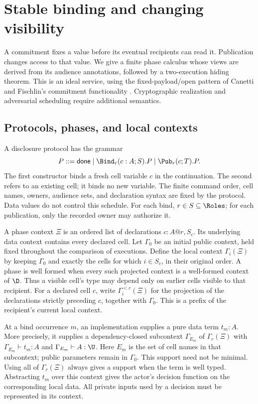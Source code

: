 \section{Stable binding and changing visibility}
\label{sec:disclosure}

A commitment fixes a value before its eventual recipients can read it.
Publication changes access to that value. We give a finite phase calculus
whose views are derived from its audience annotations, followed by a
two-execution hiding theorem. This is an ideal service, using the
fixed-payload/open pattern of Canetti and Fischlin's commitment functionality
\cite{CanettiFischlin2001}. Cryptographic realization and adversarial
scheduling require additional semantics.

\subsection{Protocols, phases, and local contexts}

A disclosure protocol has the grammar
\[
 P::=\mathsf{done}
   \mid \Bind_r(c:A;S).P
   \mid \Pub_r(c;T).P.
\]
The first constructor binds a fresh cell variable $c$ in the continuation.
The second refers to an existing cell; it binds no new variable.
The finite command order, cell names, owners, audience sets, and declaration
syntax are fixed by the protocol. Data values do not control this schedule.
For each bind, $r\in S\subseteq\Roles$; for each publication, only the
recorded owner may authorize it.

A phase context $\Xi$ is an ordered list of declarations
$c:A@r,S_c$. Its underlying data context contains every declared cell.
Let $\Gamma_0$ be an initial public context, held fixed throughout the
comparison of executions. Define the local context $\Gamma_i(\Xi)$ by
keeping $\Gamma_0$ and exactly the cells for which $i\in S_c$, in their
original order. A phase is well formed when every such projected context
is a well-formed context of $\D$. Thus a visible cell's type may depend
only on earlier cells visible to that recipient.
For a declared cell $c$, write $\Gamma_i^{<c}(\Xi)$ for the projection
of the declarations strictly preceding $c$, together with $\Gamma_0$.
This is a prefix of the recipient's current local context.

At a bind occurrence $m$, an implementation supplies a pure data term
$t_m:A$. More precisely, it supplies a dependency-closed subcontext
$\Gamma_{E_m}$ of $\Gamma_r(\Xi)$ with
$\Gamma_{E_m}\vdash t_m:A$ and $\Gamma_{E_m}\vdash A:\U$.
Here $E_m$ is the set of cell names in that subcontext; public parameters
remain in $\Gamma_0$. This support need not be minimal.
Using all of $\Gamma_r(\Xi)$ always gives a support when the term is
well typed. Abstracting $t_m$ over this context gives the actor's decision
function on the corresponding local data. All private inputs used by a
decision must be represented in its context.

